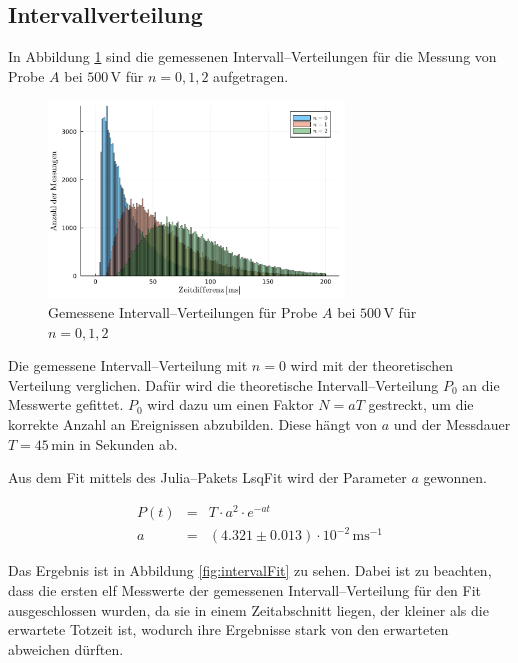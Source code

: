 \documentclass[12pt,a4paper]{scrartcl}
\numberwithin{equation}{section} %
\newcommand{\code}[1]{\textsf{#1}}
\begin{document}
\hypertarget{intervallverteilung}{%
\subsection{Intervallverteilung}\label{intervallverteilung}}
In Abbildung \ref{fig:interval} sind die gemessenen Intervall--Verteilungen für die Messung von Probe $A$ bei $500 \mathrm{\, V}$ für $n = 0,1,2$ aufgetragen.

\begin{figure}[h]
	\centering
	\includegraphics[width=0.7\textwidth]{../media/B3.1/interval.pdf}
	\caption{Gemessene Intervall--Verteilungen für Probe $A$ bei $500 \mathrm{\, V}$ für $n = 0,1,2$}
	\label{fig:interval}
\end{figure}

\noindent
Die gemessene Intervall--Verteilung mit $n = 0$ wird mit der theoretischen Verteilung verglichen. Dafür wird die theoretische Intervall--Verteilung $P_0$ an die Messwerte gefittet. $P_0$ wird dazu um einen Faktor $N=aT$ gestreckt, um die korrekte Anzahl an Ereignissen abzubilden. Diese hängt von $a$ und der Messdauer $T=45\mathrm{\,min}$ in Sekunden ab.

Aus dem Fit mittels des \code{Julia}--Pakets \code{LsqFit} \cite{Julia:LsqFit} wird der Parameter $a$ gewonnen.

\begin{eqnarray}
	P(t) &=& T \cdot a^2 \cdot e^{-at} \\
	a &=& (4.321 \pm 0.013) \cdot 10^{-2} \mathrm{\,ms^{-1}}
\end{eqnarray}

\noindent
Das Ergebnis ist in Abbildung \ref{fig:intervalFit} zu sehen. Dabei ist zu beachten, dass die ersten elf Messwerte der gemessenen Intervall--Verteilung für den Fit ausgeschlossen wurden, da sie in einem Zeitabschnitt liegen, der kleiner als die erwartete Totzeit ist, wodurch ihre Ergebnisse stark von den erwarteten abweichen dürften.
\end{document}
